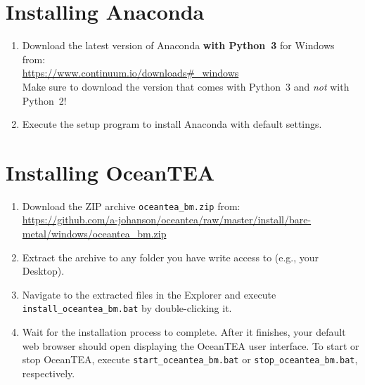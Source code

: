\documentclass[11pt,a4paper,english,oneside,parskip=false]{scrartcl} %
\begin{document}
\section{Installing Anaconda} \label{sec:anaconda}

\begin{enumerate}
	\item Download the latest version of Anaconda \textbf{with Python~3} for Windows from:\\
	\url{https://www.continuum.io/downloads#_windows}\\
	Make sure to download the version that comes with Python~3 and \emph{not} with Python~2!
	\item Execute the setup program to install Anaconda with default settings. 
\end{enumerate}




\section{Installing OceanTEA} \label{sec:oceantea}

\begin{enumerate}
	\item Download the ZIP archive \texttt{oceantea\_bm.zip} from:\\
	\url{https://github.com/a-johanson/oceantea/raw/master/install/bare-metal/windows/oceantea_bm.zip}
	\item Extract the archive to any folder you have write access to (e.g., your Desktop).
	\item Navigate to the extracted files in the Explorer and execute \texttt{install\_oceantea\_bm.bat} by double\hyp{}clicking it.
	\item Wait for the installation process to complete. After it finishes, your default web browser should open displaying the OceanTEA user interface. 
	To start or stop OceanTEA, execute \texttt{start\_oceantea\_bm.bat} or \texttt{stop\_oceantea\_bm.bat}, respectively.
\end{enumerate}
\end{document}
